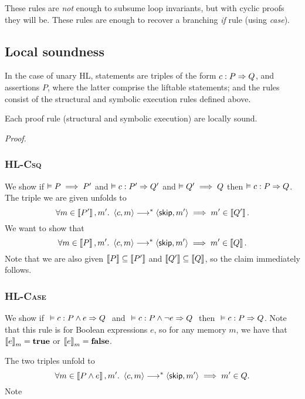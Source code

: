 \noindent
These rules are \emph{not} enough to subsume loop invariants, but with cyclic proofs they will be.
These rules are enough to recover a branching \emph{if} rule (using \emph{case}).



\subsection*{Local soundness}
In the case of unary HL,
statements are triples of the form
$\Triple c : P => Q$, and
assertions $P$,
where the latter comprise the liftable statements;
and the rules consist of the structural and symbolic execution rules defined above.


\begin{lemma}
    Each proof rule (structural and symbolic execution) are locally sound.
\end{lemma}

\noindent
\emph{Proof.}

\subsubsection*{\textsc{HL-Csq}}
We show if $\vDash P \implies P'$ and 
      $\VAL \Triple c : P' => Q'$ and 
      $\vDash Q' \implies Q$
then $\VAL \Triple c : P => Q$.
The triple we are given unfolds to
\[
    \forall m \in \Interp{P'}, m'.\
    \Cfg(c, m) \sstepstotrans \Cfg(\Skip, m')
    \implies m' \in \Interp{Q'}.
\]
We want to show that
\[
    \forall m \in \Interp P, m'.\
    \Cfg(c, m) \sstepstotrans \Cfg(\Skip, m')
    \implies m' \in \Interp Q.
\]
Note that we are also given $\left\llbracket P \right\rrbracket \subseteq \left\llbracket P' \right\rrbracket$ and $\left\llbracket Q' \right\rrbracket \subseteq \left\llbracket Q \right\rrbracket$,
so the claim immediately follows.

\subsubsection*{\textsc{HL-Case}}
We show if $\ \VAL \Triple c : P \wedge e => Q\ $ and
      $\ \VAL \Triple c : P \wedge \neg e => Q\ $ then
    $\ \VAL \Triple c : P => Q$.
Note that this rule is for Boolean expressions $e$,
so for any memory $m$, we have that $\Eval(e,m) = \True$
or $\Eval(e,m) = \False$.

The two triples unfold to
\[
    \forall m \in \Interp{P \wedge e}, m'.\
    \Cfg(c, m) \sstepstotrans \Cfg(\Skip, m') 
    \implies m' \in Q.
\]
Note

